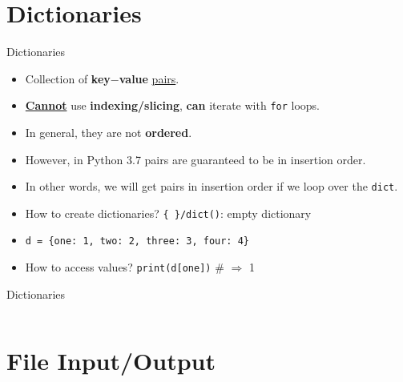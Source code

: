     \section{Dictionaries}
    \begin{frame}{Dictionaries}
        \LARGE
        \begin{itemize}
            \item Collection of \textbf{key$-$value} \underline{pairs}.
            \pause
            \item \underline{\textbf{Cannot}} use \textbf{indexing/slicing}, \textbf{can} iterate with \texttt{for} loops. 
            \pause
            \item In general, they are not \textbf{ordered}. 
            \pause
            \item However, in Python 3.7 pairs are guaranteed to be in insertion order.
            \pause
            \item In other words, we will get pairs in insertion order if we loop over the \texttt{dict}.
            \pause
            \item How to create dictionaries?
            \pause
             \texttt{\{\ \}/dict()}: empty dictionary
            \pause
            \item \texttt{d = \{\textquotesingle one\textquotesingle : 1, \textquotesingle two\textquotesingle : 2, \textquotesingle three\textquotesingle : 3, \textquotesingle four\textquotesingle : 4\}}
            \pause
            \item How to access values? 
            \pause
             \texttt{print(d[\textquotesingle one\textquotesingle ])} \# $\Rightarrow$ 1
        \end{itemize}
    \end{frame}

    \begin{frame}{Dictionaries}
        \large
        \inputminted[frame=single,framesep=2pt]{python3}{../Lecture6/code-examples/dicts.py}
    \end{frame}

    \section{File Input/Output}

